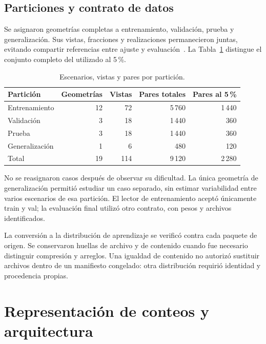 \subsection{Particiones y contrato de datos}\label{subsec:met-particiones}
Se asignaron geometrías completas a entrenamiento, validación, prueba y generalización. Sus vistas, fracciones y realizaciones permanecieron juntas, evitando compartir referencias entre ajuste y evaluación~\parencite{kaufman2012}. La Tabla~\ref{tab:met-particiones} distingue el conjunto completo del utilizado al 5\,\%.
\begin{table}[htbp]\centering\small
\caption{Escenarios, vistas y pares por partición.}\label{tab:met-particiones}
\begin{tabular}{@{}lrrrr@{}}\toprule
Partición & Geometrías & Vistas & Pares totales & Pares al 5\,\%\\\midrule
Entrenamiento & 12 & 72 & 5\,760 & 1\,440\\
Validación & 3 & 18 & 1\,440 & 360\\
Prueba & 3 & 18 & 1\,440 & 360\\
Generalización & 1 & 6 & 480 & 120\\\midrule
Total & 19 & 114 & 9\,120 & 2\,280\\\bottomrule
\end{tabular}\end{table}
No se reasignaron casos después de observar su dificultad. La única geometría de generalización permitió estudiar un caso separado, sin estimar variabilidad entre varios escenarios de esa partición. El lector de entrenamiento aceptó únicamente train y val; la evaluación final utilizó otro contrato, con pesos y archivos identificados.

La conversión a la distribución de aprendizaje se verificó contra cada paquete de origen. Se conservaron huellas de archivo y de contenido cuando fue necesario distinguir compresión y arreglos. Una igualdad de contenido no autorizó sustituir archivos dentro de un manifiesto congelado: otra distribución requirió identidad y procedencia propias.


\section{Representación de conteos y arquitectura}\label{sec:met-modelo}
